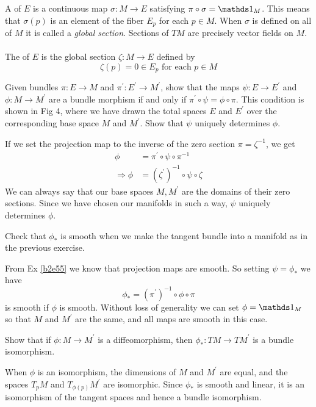 \documentclass[10pt]{article}
\begin{document}
\begin{definition}
	A  of $E$ is a continuous map $\sigma:M\to E$ satisfying $\pi \circ \sigma = \id_M$. This means that $\sigma(p)$ is an element of the fiber $E_p$ for each $p \in M$. When $\sigma$ is defined on all of $M$ it is called a \emph{global section}. Sections of $TM$ are precisely vector fields on $M$.\\\\
	The  of $E$ is the global section $\zeta:M\to E$ defined by
	$$
	\zeta(p) = 0 \in E_p \text{ for each } p \in M
	$$
\end{definition}


\begin{example}
	Given bundles $\pi:E\to M$ and $\pi^\prime:E^\prime\to M^\prime$, show that the maps $\psi:E\to E^\prime$ and $\phi:M\to M^\prime$ are a bundle morphism if and only if $\pi^\prime \circ \psi = \phi \circ \pi$. This condition is shown in Fig 4, where we have drawn the total spaces $E$ and $E^\prime$ over the corresponding base space $M$ and $M^\prime$. Show that $\psi$ uniquely determines $\phi$.
\end{example}
\sol If we set the projection map to the inverse of the zero section $\pi = \zeta^{-1}$, we get
$$
\begin{aligned}
	\phi &= \pi^\prime \circ \psi \circ \pi^{-1}\\
	\Rightarrow \phi &= (\zeta^\prime)^{-1} \circ \psi \circ \zeta
\end{aligned}
$$
We can always say that our base spaces $M, M^\prime$ are the domains of their zero sections. Since we have chosen our manifolds in such a way, $\psi$ uniquely determines $\phi$.


\begin{example}
	Check that $\phi_*$ is smooth when we make the tangent bundle into a manifold as in the previous exercise.
\end{example}
\sol From Ex \ref{b2e55} we know that projection maps are smooth. So setting $\psi=\phi_*$ we have
$$
\phi_* = (\pi^\prime)^{-1} \circ \phi \circ \pi
$$
is smooth if $\phi$ is smooth. Without loss of generality we can set $\phi = \id_M$ so that $M$ and $M^\prime$ are the same, and all maps are smooth in this case.


\begin{example}
	Show that if $\phi:M\to M^\prime$ is a diffeomorphism, then $\phi_*:TM\to TM^\prime$ is a bundle isomorphism.
\end{example}
\sol When $\phi$ is an isomorphism, the dimensions of $M$ and $M^\prime$ are equal, and the spaces $T_pM$ and $T_{\phi(p)}M^\prime$ are isomorphic. Since $\phi_*$ is smooth and linear, it is an isomorphism of the tangent spaces and hence a bundle isomorphism.
\end{document}
